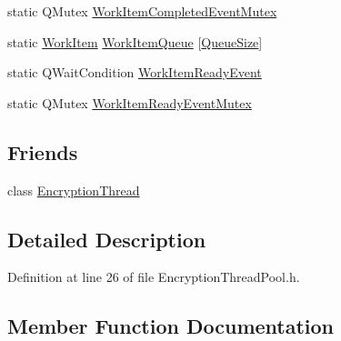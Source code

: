 \begin{DoxyCompactItemize}
static Q\+Mutex \hyperlink{class_gost_crypt_1_1_volume_1_1_encryption_thread_pool_a11847d933add5d3a3b146183d1117a3a}{Work\+Item\+Completed\+Event\+Mutex}
\item 
static \hyperlink{struct_gost_crypt_1_1_volume_1_1_encryption_thread_pool_1_1_work_item}{Work\+Item} \hyperlink{class_gost_crypt_1_1_volume_1_1_encryption_thread_pool_a9c3fad5d95bc27c9af53cde47f496e8f}{Work\+Item\+Queue} \mbox{[}\hyperlink{class_gost_crypt_1_1_volume_1_1_encryption_thread_pool_adb08affe3ba56827c426968e5b6be24c}{Queue\+Size}\mbox{]}
\item 
static Q\+Wait\+Condition \hyperlink{class_gost_crypt_1_1_volume_1_1_encryption_thread_pool_a071b6a49b6760fcf3175790aed3dcdc6}{Work\+Item\+Ready\+Event}
\item 
static Q\+Mutex \hyperlink{class_gost_crypt_1_1_volume_1_1_encryption_thread_pool_ac8b14742655ad4872cfdb7d41ae03889}{Work\+Item\+Ready\+Event\+Mutex}
\end{DoxyCompactItemize}
\subsection*{Friends}
\begin{DoxyCompactItemize}
\item 
class \hyperlink{class_gost_crypt_1_1_volume_1_1_encryption_thread_pool_a64b457ee201b3038163bce6e832dc04c}{Encryption\+Thread}
\end{DoxyCompactItemize}


\subsection{Detailed Description}


Definition at line 26 of file Encryption\+Thread\+Pool.\+h.



\subsection{Member Function Documentation}
\mbox{\label{class_gost_crypt_1_1_volume_1_1_encryption_thread_pool_ac16f2fbe2af1469672eae91f2cfcd814}} 
